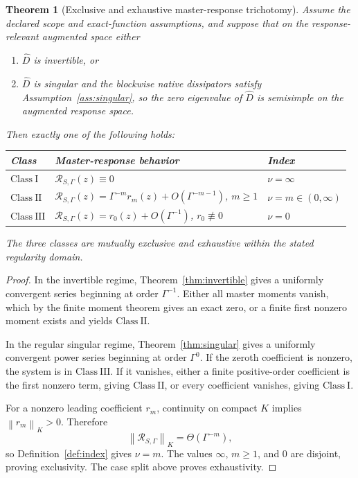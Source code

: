 \documentclass[11pt]{article}
\newtheorem{theorem}{Theorem}[section]
\theoremstyle{definition}
\theoremstyle{remark}
\theoremstyle{plain}
\newcommand{\R}{\mathcal R}
\newcommand{\normK}[1]{\left\lVert #1\right\rVert_{K}}
\newcommand{\ClassI}{\ensuremath{\mathrm{Class\ I}}}
\newcommand{\ClassII}{\ensuremath{\mathrm{Class\ II}}}
\newcommand{\ClassIII}{\ensuremath{\mathrm{Class\ III}}}
\begin{document}
\begin{theorem}[Exclusive and exhaustive master-response trichotomy]\label{thm:trichotomy}
Assume the declared scope and exact-function assumptions, and suppose that on the response-relevant augmented space either
\begin{enumerate}[label=(R\arabic*)]
 \item $\widehat D$ is invertible, or
 \item $\widehat D$ is singular and the blockwise native dissipators satisfy Assumption~\ref{ass:singular}, so the zero eigenvalue of $\widehat D$ is semisimple on the augmented response space.
\end{enumerate}
Then exactly one of the following holds:
\begin{center}
\begin{tabular}{@{}lll@{}}
\toprule
Class & Master-response behavior & Index\\
\midrule
\ClassI & $\R_{S,\Gamma}(z)\equiv0$ & $\nu=\infty$\\
\ClassII & $\R_{S,\Gamma}(z)=\Gamma^{-m}r_m(z)+O(\Gamma^{-m-1})$, $m\ge1$ & $\nu=m\in(0,\infty)$\\
\ClassIII & $\R_{S,\Gamma}(z)=r_0(z)+O(\Gamma^{-1})$, $r_0\not\equiv0$ & $\nu=0$\\
\bottomrule
\end{tabular}
\end{center}
The three classes are mutually exclusive and exhaustive within the stated regularity domain.
\end{theorem}

\begin{proof}
In the invertible regime, Theorem~\ref{thm:invertible} gives a uniformly convergent series beginning at order $\Gamma^{-1}$.  Either all master moments vanish, which by the finite moment theorem gives an exact zero, or a finite first nonzero moment exists and yields \ClassII.

In the regular singular regime, Theorem~\ref{thm:singular} gives a uniformly convergent power series beginning at order $\Gamma^0$.  If the zeroth coefficient is nonzero, the system is in \ClassIII.  If it vanishes, either a finite positive-order coefficient is the first nonzero term, giving \ClassII, or every coefficient vanishes, giving \ClassI.

For a nonzero leading coefficient $r_m$, continuity on compact $K$ implies $\normK{r_m}>0$.  Therefore
\[
 \normK{\R_{S,\Gamma}}=\Theta(\Gamma^{-m}),
\]
so Definition~\ref{def:index} gives $\nu=m$.  The values $\infty$, $m\ge1$, and $0$ are disjoint, proving exclusivity.  The case split above proves exhaustivity.
\end{proof}
\end{document}
